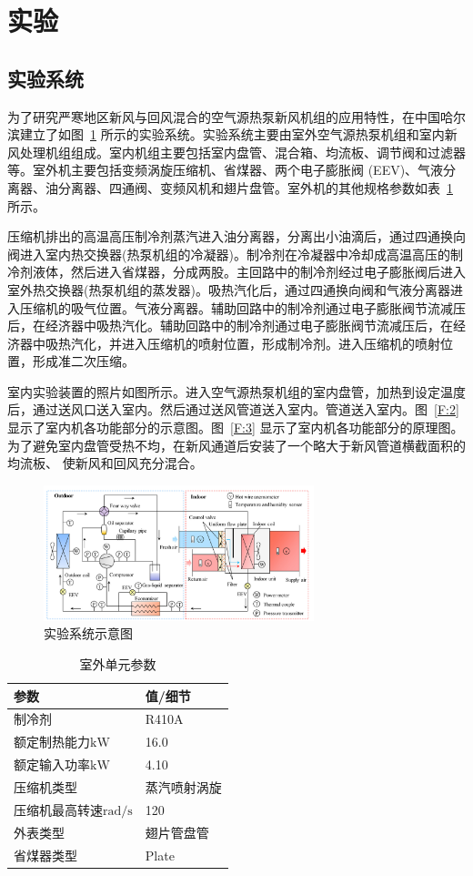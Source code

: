 \section{实验}
\subsection{实验系统}
为了研究严寒地区新风与回风混合的空气源热泵新风机组的应用特性，在中国哈尔滨建立了如图~\ref{F:1} 所示的实验系统。实验系统主要由室外空气源热泵机组和室内新风处理机组组成。室内机组主要包括室内盘管、混合箱、均流板、调节阀和过滤器等。室外机主要包括变频涡旋压缩机、省煤器、两个电子膨胀阀 (EEV)、气液分离器、油分离器、四通阀、变频风机和翅片盘管。室外机的其他规格参数如表~\ref{T:1} 所示。

压缩机排出的高温高压制冷剂蒸汽进入油分离器，分离出小油滴后，通过四通换向阀进入室内热交换器(热泵机组的冷凝器)。制冷剂在冷凝器中冷却成高温高压的制冷剂液体，然后进入省煤器，分成两股。主回路中的制冷剂经过电子膨胀阀后进入室外热交换器(热泵机组的蒸发器)。吸热汽化后，通过四通换向阀和气液分离器进入压缩机的吸气位置。气液分离器。辅助回路中的制冷剂通过电子膨胀阀节流减压后，在经济器中吸热汽化。辅助回路中的制冷剂通过电子膨胀阀节流减压后，在经济器中吸热汽化，并进入压缩机的喷射位置，形成制冷剂。进入压缩机的喷射位置，形成准二次压缩。

室内实验装置的照片如图所示。进入空气源热泵机组的室内盘管，加热到设定温度后，通过送风口送入室内。然后通过送风管道送入室内。管道送入室内。图~\ref{F:2} 显示了室内机各功能部分的示意图。图~\ref{F:3} 显示了室内机各功能部分的原理图。为了避免室内盘管受热不均，在新风通道后安装了一个略大于新风管道横截面积的均流板、 使新风和回风充分混合。

\begin{figure}[htbp]
	\centering
	\includegraphics[width=0.7\textwidth]{figure/figure_1}
	\caption{实验系统示意图}
	\label{F:1}
\end{figure}

\begin{table}[ht]
	\centering
	\caption{室外单元参数}
	\begin{tabular}{@{}ll@{}}
		\toprule
		参数 & 值/细节 \\ \midrule
		制冷剂 & R410A \\
		额定制热能力$\unit{\kW} $ & 16.0 \\
		额定输入功率$\unit{\kW} $ & 4.10 \\
		压缩机类型 & 蒸汽喷射涡旋 \\
		压缩机最高转速$\unit{\radian/\s} $ & 120 \\
		外表类型 & 翅片管盘管 \\
		省煤器类型 & Plate \\ \bottomrule
	\end{tabular}
	\label{T:1}
\end{table}

